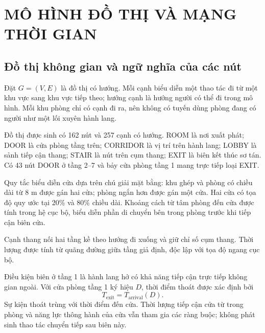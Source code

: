 \clearpage\section{MÔ HÌNH ĐỒ THỊ VÀ MẠNG THỜI GIAN}
\subsection{Đồ thị không gian và ngữ nghĩa của các nút}
Đặt $G=(V,E)$ là đồ thị có hướng. Mỗi cạnh biểu diễn một thao tác đi từ một khu vực sang khu vực tiếp theo; hướng cạnh là hướng người có thể đi trong mô hình. Mỗi khu phòng chỉ có cạnh đi ra, nên không có tuyến dùng phòng đang có người như một lối xuyên hành lang.

\noindent\begin{minipage}[t]{0.45\linewidth}\end{minipage}\hfill
\begin{minipage}[t]{0.53\linewidth}\end{minipage}

Đồ thị được sinh có 162 nút và 257 cạnh có hướng. ROOM là nơi xuất phát; DOOR là cửa phòng tầng trên; CORRIDOR là vị trí trên hành lang; LOBBY là sảnh tiếp cận thang; STAIR là nút trên cụm thang; EXIT là biên kết thúc sơ tán. Có 43 nút DOOR ở tầng 2--7 và bảy cửa phòng tầng 1 mang trực tiếp loại EXIT.

Quy tắc biểu diễn cửa dựa trên chú giải mặt bằng: khu ghép và phòng có chiều dài từ 8 m được gán hai cửa; phòng ngắn hơn được gán một cửa. Hai cửa có tọa độ quy ước tại 20\% và 80\% chiều dài. Khoảng cách từ tâm phòng đến cửa được tính trong hệ cục bộ, biểu diễn phần di chuyển bên trong phòng trước khi tiếp cận biên cửa.

Cạnh thang nối hai tầng kề theo hướng đi xuống và giữ chỉ số cụm thang. Thời lượng được tính từ quãng đường giữa tầng giả định, độc lập với tọa độ ngang cục bộ.

Điều kiện biên ở tầng 1 là hành lang hở có khả năng tiếp cận trực tiếp không gian ngoài. Với cửa phòng tầng 1 ký hiệu $D$, thời điểm thoát được xác định bởi
\begin{equation}T_{\mathrm{exit}}=T_{\mathrm{arrival}}(D).\end{equation}
Sự kiện thoát trùng với thời điểm đến cửa. Thời lượng tiếp cận cửa từ trong phòng và năng lực thông hành của cửa vẫn tham gia các ràng buộc; không phát sinh thao tác chuyển tiếp sau biên này.


